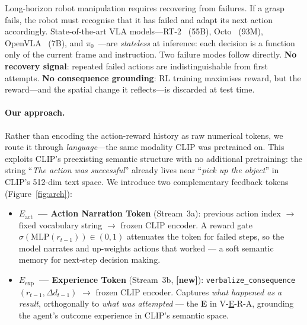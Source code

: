 \documentclass{article}
\newcommand{\Lact}{$E_{\mathrm{act}}$\xspace}   %
\newcommand{\Lexp}{$E_{\mathrm{exp}}$\xspace}   %
\newcommand{\NEW}{\textcolor{NewOrange}{\textbf{[new]}}\xspace}
\begin{document}
Long-horizon robot manipulation requires recovering from failures.
If a grasp fails, the robot must recognise that it has failed and adapt
its next action accordingly.
State-of-the-art VLA models---RT-2~\citep{brohan2023rt2} (55B),
Octo~\citep{octo2024} (93M), OpenVLA~\citep{kim2024openvla} (7B),
and $\pi_0$~\citep{black2024pi0}---are \emph{stateless} at inference:
each decision is a function only of the current frame and instruction.
Two failure modes follow directly.
\textbf{No recovery signal}: repeated failed actions are
indistinguishable from first attempts.
\textbf{No consequence grounding}: RL training maximises reward, but the
reward---and the spatial change it reflects---is discarded at test time.

\paragraph{Our approach.}
Rather than encoding the action-reward history as raw numerical tokens, we
route it through \emph{language}---the same modality CLIP was pretrained
on.
This exploits CLIP's preexisting semantic structure with no additional
pretraining: the string ``\emph{The action was successful}'' already
lives near ``\emph{pick up the object}'' in CLIP's 512-dim text space.
We introduce two complementary feedback tokens (Figure~\ref{fig:arch}):

\begin{itemize}[leftmargin=1.5em,itemsep=2pt]
\item \textbf{\Lact\ — Action Narration Token} (Stream~3a): previous action
  index $\to$ fixed vocabulary string $\to$ frozen CLIP encoder.
  A reward gate $\sigma(\mathrm{MLP}(r_{t-1}))\!\in\!(0,1)$ attenuates
  the token for failed steps, so the model narrates and up-weights
  actions that worked — a soft semantic memory for next-step decision making.
\item \textbf{\Lexp\ — Experience Token} (Stream~3b, \NEW):
  \texttt{verbalize\_consequence}$(r_{t-1}, \Delta d_{t-1})$ $\to$
  frozen CLIP encoder. Captures \emph{what happened as a result},
  orthogonally to \emph{what was attempted} — the \textbf{E} in
  V-\underline{E}-R-A, grounding the agent's outcome experience
  in CLIP's semantic space.
\end{itemize}
\end{document}
